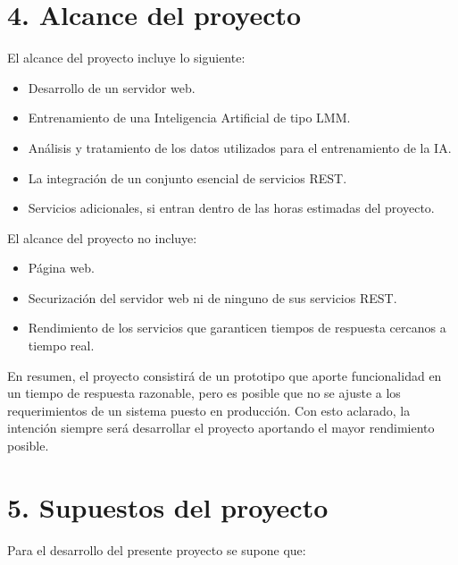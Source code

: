 \documentclass[
11pt, %
]{Clases/charter}
\begin{document}
\section{4. Alcance del proyecto}
\label{sec:alcance}

El alcance del proyecto incluye lo siguiente:
\begin{itemize}
	\item Desarrollo de un servidor web.
	\item Entrenamiento de una Inteligencia Artificial de tipo LMM.
	\item Análisis y tratamiento de los datos utilizados para el entrenamiento de la IA.
	\item La integración de un conjunto esencial de servicios REST.
	\item Servicios adicionales, si entran dentro de las horas estimadas del proyecto.
\end{itemize}

El alcance del proyecto no incluye:
\begin{itemize}
	\item Página web.
	\item Securización del servidor web ni de ninguno de sus servicios REST.
	\item Rendimiento de los servicios que garanticen tiempos de respuesta cercanos a tiempo real.
\end{itemize}

En resumen, el proyecto consistirá de un prototipo que aporte funcionalidad en un tiempo de respuesta razonable,
pero es posible que no se ajuste a los requerimientos de un sistema puesto en producción.
Con esto aclarado, la intención siempre será desarrollar el proyecto aportando el mayor rendimiento posible.


\section{5. Supuestos del proyecto}
\label{sec:supuestos}
Para el desarrollo del presente proyecto se supone que:
\end{document}
